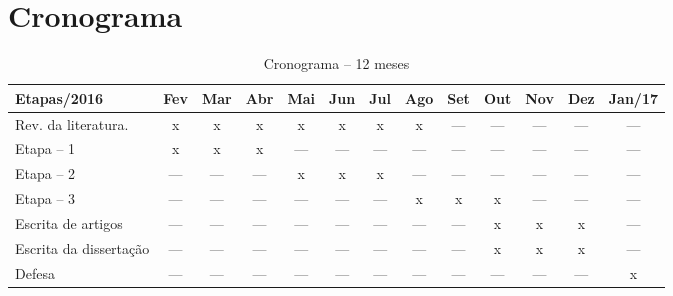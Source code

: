  
\section{Cronograma}\label{intro:cronograma}


\begin{table}[htbp]
 \scriptsize
      \centering  \caption{Cronograma -- 12 meses}
	\begin{tabular}{l|c|c|c|c|c|c|c|c|c|c|c|c}
	\hline
	\textbf{Etapas/2016} & \textbf{Fev} & \textbf{Mar} & \textbf{Abr} & \textbf{Mai}& \textbf{Jun} & \textbf{Jul} & \textbf{Ago} & \textbf{Set} & \textbf{Out} & \textbf{Nov} & \textbf{Dez} & \textbf{Jan/17} \\
	  \hline
	  Rev. da literatura. & x & x & x & x & x & x & x & --- & --- & --- & --- & --- \\ \hline
	  Etapa -- 1 & x & x & x & --- & --- & --- & --- & --- & --- & --- & --- & --- \\ \hline
	  Etapa -- 2 & --- & --- & --- & x & x & x & --- & --- & --- & --- & --- & --- \\ \hline
	  Etapa -- 3 & --- & --- & --- & --- & --- & --- & x & x & x & --- & --- & --- \\ \hline
	  Escrita de artigos & --- & --- & --- & --- & --- & --- & --- & --- & x & x & x & --- \\ \hline
	  Escrita da dissertação & --- & --- & --- & --- & --- & --- & --- & --- & x & x & x & --- \\ \hline
	  Defesa & --- & --- & --- & --- & --- & --- & --- & --- & --- & --- & --- & x \\ \hline
	\end{tabular}
\end{table}


 



